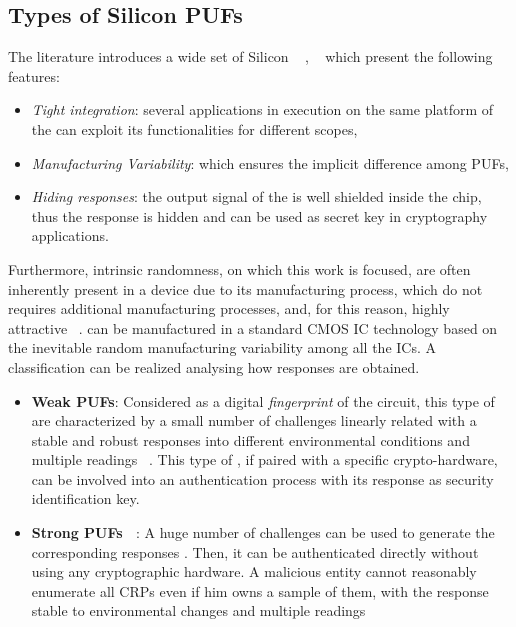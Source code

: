 \documentclass[../tesi.tex]{subfiles}
\begin{document}
\subsection{Types of Silicon PUFs} \label{subsect:siliconpuf}
The literature introduces a wide set of Silicon  ~\cite{bohm2012physical} , ~\cite{maes2013physically} which present the following features: 
\begin{itemize}
\item \textit{Tight integration}: several applications in execution on the same platform of the \puf{} can exploit its functionalities for different scopes,
\item \textit{Manufacturing Variability}: which ensures the implicit difference among PUFs, 
\item \textit{Hiding responses}: the output signal of the \puf{} is well shielded inside the chip, thus the response is hidden and can be used as secret key in cryptography applications.
\end{itemize}
Furthermore,  intrinsic randomness, on which this work is focused, are often inherently present in a device due to its manufacturing process, which do not requires additional manufacturing processes, and, for this reason, highly attractive ~\cite{maes2010physically}.  can be manufactured in a standard CMOS IC technology based on the inevitable random manufacturing variability among all the ICs.  
A \puf{} classification can be realized analysing how responses are obtained.  
\begin{itemize}
\item \textbf{Weak PUFs}: Considered as a digital \emph{fingerprint} of the circuit, this type of  are characterized by a small number of challenges linearly related with a stable and robust responses into different environmental conditions and multiple readings ~\cite{herder2014physical}. This type of \puf{}, if paired with a specific crypto-hardware, can be involved into  an authentication process with its response as security identification key.
 \item \textbf{Strong PUFs ~\cite{guajardo2007fpga}}: A huge number of challenges can be used to generate the corresponding responses . Then, it can be authenticated directly without using any cryptographic hardware. A malicious entity cannot reasonably enumerate all CRPs even if him owns a sample of them, with the response stable to environmental changes and multiple readings

\end{itemize} 
\end{document}

